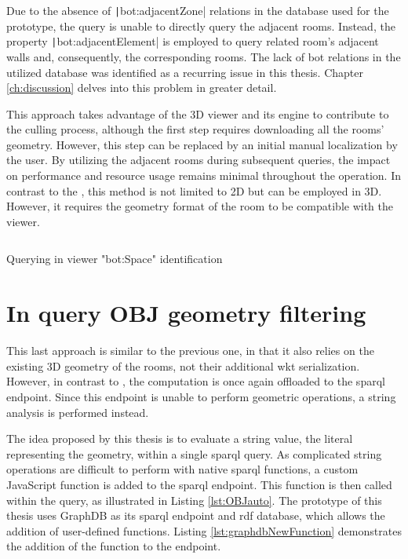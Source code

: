 Due to the absence of \texttt|bot:adjacentZone| relations in the database used for the prototype, the query is unable to directly query the adjacent rooms. Instead, the property \texttt|bot:adjacentElement| is employed to query related room's adjacent walls and, consequently, the corresponding rooms. The lack of \ac{bot} relations in the utilized database was identified as a recurring issue in this thesis. Chapter \ref{ch:discussion} delves into this problem in greater detail.

This approach takes advantage of the 3D viewer and its engine to contribute to the culling process, although the first step requires downloading all the rooms' geometry. However, this step can be replaced by an initial manual localization by the user. By utilizing the adjacent rooms during subsequent queries, the impact on performance and resource usage remains minimal throughout the operation. In contrast to the , this method is not limited to 2D but can be employed in 3D. However, it requires the geometry format of the room to be compatible with the viewer.

\begin{listing}[H]
    \inputminted{sparql}{dynamicQueries/inViewer/query.rq}
    \vspace{-0.7cm}
    \caption{Querying in viewer "bot:Space" identification}
    \label{lst:BOTauto}
\end{listing}

\section{In query OBJ geometry filtering}
This last approach is similar to the previous one, in that it also relies on the existing 3D geometry of the rooms, not their additional \ac{wkt} serialization. However, in contrast to , the computation is once again offloaded to the \ac{sparql} endpoint. Since this endpoint is unable to perform geometric operations, a string analysis is performed instead.

The idea proposed by this thesis is to evaluate a string value, the literal representing the geometry, within a single \ac{sparql} query. As complicated string operations are difficult to perform with native \ac{sparql} functions, a custom JavaScript function is added to the \ac{sparql} endpoint. This function is then called within the query, as illustrated in Listing \ref{lst:OBJauto}. The prototype of this thesis uses GraphDB as its \ac{sparql} endpoint and \ac{rdf} database, which allows the addition of user-defined functions. Listing \ref{lst:graphdbNewFunction} demonstrates the addition of the function to the endpoint.

